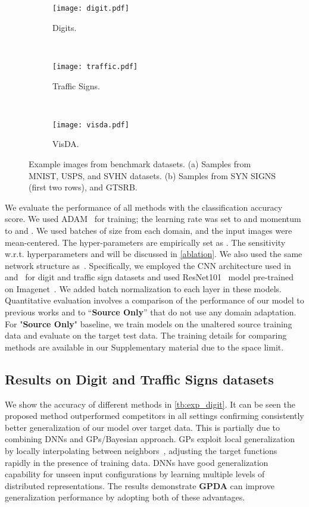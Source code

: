 \documentclass[10pt,letterpaper]{article}
\begin{document}
\begin{figure}[t]
\centering
 \begin{subfigure}[t]{0.3\linewidth}
    \texttt{[image: digit.pdf]} 
    \caption{Digits.}
 \end{subfigure} \
 \begin{subfigure}[t]{0.3\linewidth}
    \texttt{[image: traffic.pdf]}
    \caption{Traffic Signs.}
  \end{subfigure} \
  \begin{subfigure}[t]{0.3\linewidth}
    \texttt{[image: visda.pdf]}
    \caption{VisDA.}
   \end{subfigure}
\vspace{-0.8em}
\caption{Example images from benchmark datasets. (a) Samples from MNIST, USPS, and SVHN datasets. (b) Samples from SYN SIGNS (first two rows), and GTSRB.
}
\label{amazon}
\vspace{-0.8em}
\end{figure}


We evaluate the performance of all methods with the classification accuracy score. We used ADAM~\cite{kingma2014adam} for training; the learning rate was set to  and momentum to  and . We used batches of size  from each domain, and the input images were mean-centered. The hyper-parameters are empirically set as . The sensitivity w.r.t. hyperparameters  and  will
be discussed in \autoref{ablation}. We also used the same network structure as~\cite{saito2018}. Specifically, we employed the CNN architecture used in~\cite{ganin2014unsupervised} and~\cite{bousmalis2017unsupervised} for digit and traffic sign datasets and used ResNet101~\cite{he2016deep} model pre-trained on Imagenet~\cite{deng2009imagenet}. We added batch normalization to each layer in these models. Quantitative  evaluation  involves a comparison
of the performance of our model to previous works and to
“\textbf{Source Only}” that do not use any  domain  adaptation. For "\textbf{Source Only}" baseline, we  train  models on  the  unaltered  source  training  data  and  evaluate on the target test data. The training details
for comparing methods are available in our Supplementary
material due to the space limit.

\subsection{Results on Digit and Traffic Signs datasets}
We show the accuracy of different methods in \autoref{tb:exp_digit}. It can be seen the proposed method outperformed competitors in all settings confirming consistently better generalization of our model over target data. This is partially due to combining DNNs and GPs/Bayesian approach. GPs exploit local generalization by locally interpolating between neighbors~\cite{bengio2013representation}, adjusting the target functions rapidly in the presence of training data.  DNNs have good generalization capability for unseen input configurations by learning multiple levels of distributed representations. The results demonstrate \textbf{GPDA} can improve generalization performance by adopting both of these advantages.
\end{document}
